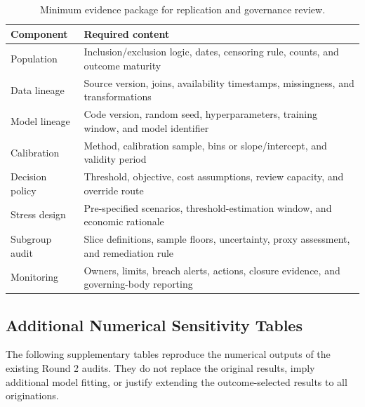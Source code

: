 \documentclass[10pt]{article}
\begin{document}
\begin{table}[!ht]
\centering
\caption{Minimum evidence package for replication and governance review.}
\label{tab:audit_package}
\begin{tabular}{L{3.5cm}L{10.5cm}}
\toprule
Component & Required content \\
\midrule
Population & Inclusion/exclusion logic, dates, censoring rule, counts, and outcome maturity \\
Data lineage & Source version, joins, availability timestamps, missingness, and transformations \\
Model lineage & Code version, random seed, hyperparameters, training window, and model identifier \\
Calibration & Method, calibration sample, bins or slope/intercept, and validity period \\
Decision policy & Threshold, objective, cost assumptions, review capacity, and override route \\
Stress design & Pre-specified scenarios, threshold-estimation window, and economic rationale \\
Subgroup audit & Slice definitions, sample floors, uncertainty, proxy assessment, and remediation rule \\
Monitoring & Owners, limits, breach alerts, actions, closure evidence, and governing-body reporting \\
\bottomrule
\end{tabular}
\end{table}





\subsection{Additional Numerical Sensitivity Tables}
\label{app:r2_numerical_supplements}

The following supplementary tables reproduce the numerical outputs of the existing Round 2 audits. They do not replace the original results, imply additional model fitting, or justify extending the outcome-selected results to all originations.

\setcounter{table}{0}
\renewcommand{\thetable}{S\arabic{table}}
\end{document}
